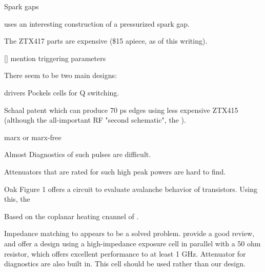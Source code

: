 \documentclass[paper.tex]{subfiles}
\begin{document}
Spark gaps 

\cite{kHz1995} uses an interesting construction of a pressurized spark gap.

The ZTX417 parts are expensive (\$15 apiece, as of this writing). 

[] mention triggering parameters

There seem to be two main designs: 

drivers Pockels cells for Q switching.

Schaal patent  which can produce 70 ps edges using less expensive ZTX415 (although the all-important RF "second schematic", the ).

marx or marx-free



Almost   Diagnostics of such pulses are difficult.

Attenuators that are rated for such high peak powers are hard to find.


Oak \cite{fast1991} Figure 1 offers a circuit to evaluate avalanche behavior of transistors. Using this, the 


Based on the coplanar heating cnannel of \cite{Microwave2007}.

Impedance matching to appears to be a solved problem. \cite{Microchamber2011} provide a good review, and offer a design using a high-impedance exposure cell in parallel with a 50 ohm resistor, which offers excellent performance to at least 1 GHz. Attenuator for diagnostics are also built in. This cell should be used rather than our design. \cite{Characterization2012}
\end{document}
